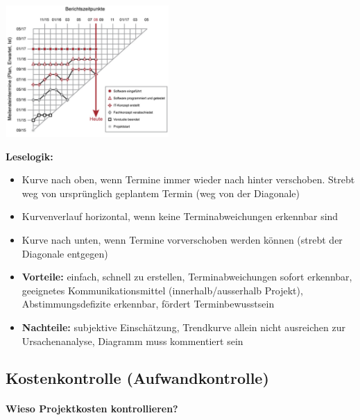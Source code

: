 \documentclass[a4paper]{article}
\begin{document}
		\begin{minipage}{.45\textwidth}
			\includegraphics[height=5cm]{img/pm/termintrend.png}
		\end{minipage}
		\begin{minipage}{.45\textwidth}
			\textbf{Leselogik:}
			\begin{itemize}
				\item Kurve nach oben, wenn Termine immer wieder nach hinter verschoben.
				Strebt weg von ursprünglich geplantem Termin (weg von der Diagonale)
				\item Kurvenverlauf horizontal, wenn keine Terminabweichungen erkennbar sind
				\item Kurve nach unten, wenn Termine vorverschoben werden können (strebt der Diagonale entgegen)
			\end{itemize}
		\end{minipage}
		\vspace{1em}
		\begin{itemize}
			\item \textbf{Vorteile:} einfach, schnell zu erstellen, Terminabweichungen sofort erkennbar, geeignetes Kommunikationsmittel (innerhalb/ausserhalb Projekt), Abstimmungsdefizite erkennbar, fördert Terminbewusstsein
			\item \textbf{Nachteile:} subjektive Einschätzung, Trendkurve allein nicht ausreichen zur Ursachenanalyse, Diagramm muss kommentiert sein
		\end{itemize}
		
\newpage

	\subsection{Kostenkontrolle (Aufwandkontrolle)}
	
			\paragraph{Wieso Projektkosten kontrollieren?}
			
\end{document}
